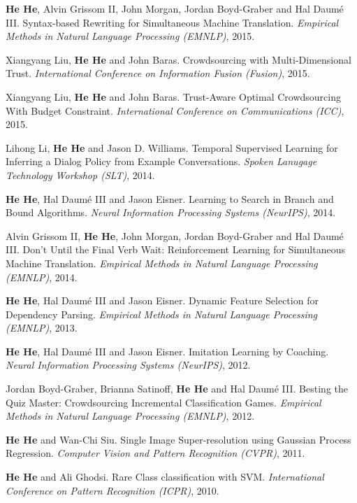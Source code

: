 \textbf{He He}, Alvin Grissom II, John Morgan, Jordan Boyd-Graber and Hal Daum\'e III. Syntax-based Rewriting for Simultaneous Machine Translation. \textit{Empirical Methods in Natural Language Processing (EMNLP)}, 2015.

Xiangyang Liu, \textbf{He He} and John Baras. Crowdsourcing with Multi-Dimensional Trust. \textit{International Conference on Information Fusion (Fusion)}, 2015.

Xiangyang Liu, \textbf{He He} and John Baras. Trust-Aware Optimal Crowdsourcing With Budget Constraint. \textit{International Conference on Communications (ICC)}, 2015.

Lihong Li, \textbf{He He} and Jason D. Williams. Temporal Supervised Learning for Inferring a Dialog Policy from Example Conversations. \textit{Spoken Lanugage Technology Workshop (SLT)}, 2014.

\textbf{He He}, Hal Daum\'e III and Jason Eisner. Learning to Search in Branch and Bound Algorithms. \textit{Neural Information Processing Systems (NeurIPS)}, 2014.

Alvin Grissom II, \textbf{He He}, John Morgan, Jordan Boyd-Graber and Hal Daum\'e III. Don't Until the Final Verb Wait: Reinforcement Learning for Simultaneous Machine Translation. \textit{Empirical Methods in Natural Language Processing (EMNLP)}, 2014.

\textbf{He He}, Hal Daum\'e III and Jason Eisner. Dynamic Feature Selection for Dependency Parsing. \textit{Empirical Methods in Natural Language Processing (EMNLP)}, 2013.

\textbf{He He}, Hal Daum\'e III and Jason Eisner. Imitation Learning by Coaching. \textit{Neural Information Processing Systems (NeurIPS)}, 2012.

Jordan Boyd-Graber, Brianna Satinoff, \textbf{He He} and Hal Daum\'e III. Besting the Quiz Master: Crowdsourcing Incremental Classification Games. \textit{Empirical Methods in Natural Language Processing (EMNLP)}, 2012.

\textbf{He He} and Wan-Chi Siu. Single Image Super-resolution using Gaussian Process Regression. \textit{Computer Vision and Pattern Recognition (CVPR)}, 2011.

\textbf{He He} and Ali Ghodsi. Rare Class classification with SVM. \textit{International Conference on Pattern Recognition (ICPR)}, 2010.


